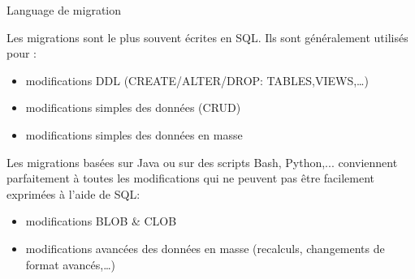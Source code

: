 \documentclass[slidestop,compress,11pt,xcolor=dvipsnames,french]{beamer}
\begin{document}
\begin{frame}{Language de migration}

Les migrations sont le plus souvent écrites en SQL. Ils sont généralement utilisés pour :

\begin{itemize}
\item modifications DDL (CREATE/ALTER/DROP: TABLES,VIEWS,…)
\item modifications simples des données (CRUD)
\item modifications simples des données en masse
\end{itemize}

\vspace{1cm}

Les migrations basées sur Java ou sur des scripts Bash, Python,... conviennent parfaitement à toutes les modifications qui ne peuvent pas être facilement exprimées à l'aide de SQL:
\begin{itemize}
 \item modifications BLOB \& CLOB
 \item modifications avancées des données en masse (recalculs, changements de format avancés,…)
\end{itemize}

\end{frame}
\end{document}
